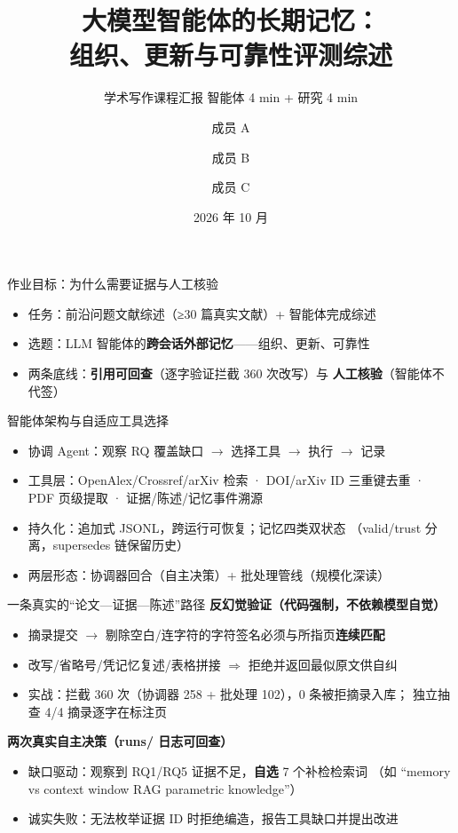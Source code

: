 \documentclass[UTF8, aspectratio=169]{ctexbeamer}
\title{大模型智能体的长期记忆：\\组织、更新与可靠性评测综述}
\subtitle{学术写作课程汇报 \quad 智能体 4 min + 研究 4 min}
\author{成员 A \and 成员 B \and 成员 C}  %
\date{2026 年 10 月}
\begin{document}
\begin{frame}{作业目标：为什么需要证据与人工核验}
\begin{itemize}
  \item 任务：前沿问题文献综述（≥30 篇真实文献）+ 智能体完成综述
  \item 选题：LLM 智能体的\textbf{跨会话外部记忆}——组织、更新、可靠性
  \item 两条底线：\textbf{引用可回查}（逐字验证拦截 360 次改写）与
        \textbf{人工核验}（智能体不代签）
\end{itemize}
\end{frame}

\begin{frame}{智能体架构与自适应工具选择}
\begin{itemize}
  \item 协调 Agent：观察 RQ 覆盖缺口 $\to$ 选择工具 $\to$ 执行 $\to$ 记录
  \item 工具层：OpenAlex/Crossref/arXiv 检索 · DOI/arXiv ID 三重键去重 ·
        PDF 页级提取 · 证据/陈述/记忆事件溯源
  \item 持久化：追加式 JSONL，跨运行可恢复；记忆四类双状态
        （valid/trust 分离，supersedes 链保留历史）
  \item 两层形态：协调器回合（自主决策）+ 批处理管线（规模化深读）
\end{itemize}
\end{frame}

\begin{frame}{一条真实的``论文—证据—陈述''路径}
\textbf{反幻觉验证（代码强制，不依赖模型自觉）}
\begin{itemize}
  \item 摘录提交 $\to$ 剔除空白/连字符的字符签名必须与所指页\textbf{连续匹配}
  \item 改写/省略号/凭记忆复述/表格拼接 $\Rightarrow$ 拒绝并返回最似原文供自纠
  \item 实战：拦截 360 次（协调器 258 + 批处理 102），0 条被拒摘录入库；
        独立抽查 4/4 摘录逐字在标注页
\end{itemize}
\pause
\textbf{两次真实自主决策（runs/ 日志可回查）}
\begin{itemize}
  \item 缺口驱动：观察到 RQ1/RQ5 证据不足，\textbf{自选} 7 个补检检索词
        （如 ``memory vs context window RAG parametric knowledge''）
  \item 诚实失败：无法枚举证据 ID 时拒绝编造，报告工具缺口并提出改进
\end{itemize}
\end{frame}
\end{document}
